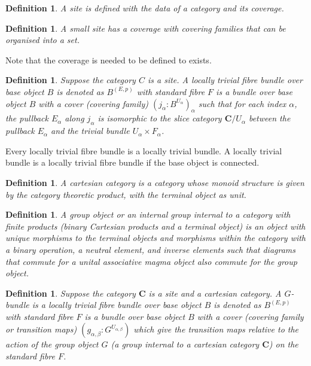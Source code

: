 \documentclass{tufte-book}
\newtheorem{definition}[theorem]{Definition}
\begin{document}
\begin{definition}
	A site is defined with the data of a category and its coverage.
\end{definition}

\begin{definition}
	A small site has a coverage with covering families that can be organised into a set.
\end{definition}

Note that the coverage is needed to be defined to exists.

\begin{definition}
	Suppose the category $C$ is a site.
	A locally trivial fibre bundle over base object $B$ is denoted as $B^{(E, p)}$ with standard fibre $F$ is a bundle over base object $B$ with a cover (covering family) $(j_\alpha : B^{U_\alpha})_\alpha$ such that for each index $\alpha$, the pullback $E_\alpha$ along $j_\alpha$ is isomorphic to the slice category $\mathbf{C} / U_\alpha$ between the pullback $E_\alpha$ and the trivial bundle $U_\alpha \times F_\alpha$.
\end{definition}

Every locally trivial fibre bundle is a locally trivial bundle. A locally trivial bundle is a locally trivial fibre bundle if the base object is connected.

\begin{definition}
	A cartesian category is a category whose monoid structure is given by the category theoretic product, with the terminal object as unit.
\end{definition}

\begin{definition}
	A group object or an internal group internal to a category with finite products (binary Cartesian products and a terminal object) is an object with unique morphisms to the terminal objects and morphisms within the category with a binary operation, a neutral element, and inverse elements such that diagrams that commute for a unital associative magma object also commute for the group object.
\end{definition}

\begin{definition}
	Suppose the category $\mathbf{C}$ is a site and a cartesian category.
	A $G$-bundle is a locally trivial fibre bundle over base object $B$ is denoted as $B^{(E, p)}$ with standard fibre $F$ is a bundle over base object $B$ with a cover (covering family or transition maps) $(g_{\alpha, \beta} : G^{U_{\alpha, \beta}})$ which give the transition maps relative to the action of the group object $G$ (a group internal to a cartesian category $\mathbf{C}$) on the standard fibre $F$.
\end{definition}
\end{document}
